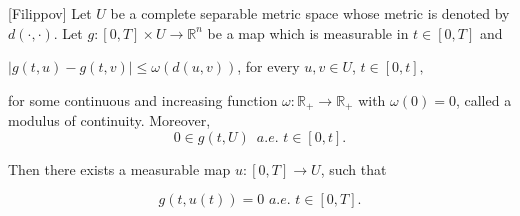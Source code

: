 \begin{lemma}
    \label{FL}[Filippov]
    Let $U$ be a complete separable metric space whose metric is denoted by 
    $d(\cdot,\cdot)$. Let $g:[0,T]\times U\rightarrow \mathbb{R}^n$ be a map 
    which is measurable in $t\in[0,T]$ and
    
    \begin{center}
        $|g(t,u)-g(t,v)|\leq \omega(d(u,v))$, for every $u,v\in U$, $t\in 
        [0,t],$
    \end{center}
%
     for some continuous and increasing function 
     $\omega:\mathbb{R}_{+}\rightarrow \mathbb{R}_{+}$ with $\omega(0)=0$, 
     called a modulus of continuity. Moreover,
%
    \begin{equation*}
        0\in g(t,U)\,\,\,a.e. \,\,t\in [0,t].
    \end{equation*}
    
    Then there exists a measurable map $u:[0,T]\rightarrow U$, such that 
    
    \begin{equation}\label{eq1.17}
        g(t,u(t))=0\,\, a.e.\,\, t\in [0,T].
    \end{equation}
\end{lemma}

